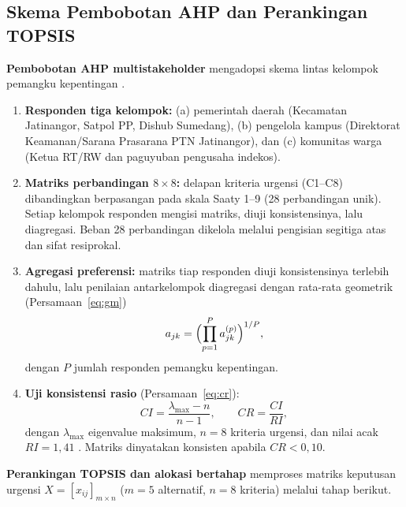 \documentclass[10pt,twocolumn,a4paper]{article}
\begin{document}
\subsection{Skema Pembobotan AHP dan Perankingan TOPSIS}
\textbf{Pembobotan AHP multistakeholder} mengadopsi skema lintas kelompok pemangku kepentingan \cite{ahmed}.
\begin{enumerate}[label=\arabic*)]
\item \textbf{Responden tiga kelompok:} (a) pemerintah daerah (Kecamatan Jatinangor, Satpol PP, Dishub Sumedang), (b) pengelola kampus (Direktorat Keamanan/Sarana Prasarana PTN Jatinangor), dan (c) komunitas warga (Ketua RT/RW dan paguyuban pengusaha indekos).
\item \textbf{Matriks perbandingan $8\times8$:} delapan kriteria urgensi (C1--C8) dibandingkan berpasangan pada skala Saaty 1--9 (28 perbandingan unik). Setiap kelompok responden mengisi matriks, diuji konsistensinya, lalu diagregasi. Beban 28 perbandingan dikelola melalui pengisian segitiga atas dan sifat resiprokal.
\item \textbf{Agregasi preferensi:} matriks tiap responden diuji konsistensinya terlebih dahulu, lalu penilaian antarkelompok diagregasi dengan rata-rata geometrik (Persamaan~\eqref{eq:gm})
\begin{equation}
a_{jk}=\Bigl(\prod_{p=1}^{P} a_{jk}^{(p)}\Bigr)^{1/P},\label{eq:gm}
\end{equation}
dengan $P$ jumlah responden pemangku kepentingan.
\item \textbf{Uji konsistensi rasio} (Persamaan~\eqref{eq:cr}):
\begin{equation}
\mathit{CI}=\frac{\lambda_{\max}-n}{n-1},\qquad \mathit{CR}=\frac{\mathit{CI}}{\mathit{RI}},\label{eq:cr}
\end{equation}
dengan $\lambda_{\max}$ eigenvalue maksimum, $n=8$ kriteria urgensi, dan nilai acak $\mathit{RI}=1{,}41$ \cite{saaty}. Matriks dinyatakan konsisten apabila $\mathit{CR}<0{,}10$.
\end{enumerate}
\textbf{Perankingan TOPSIS dan alokasi bertahap} memproses matriks keputusan urgensi $X=[x_{ij}]_{m\times n}$ ($m=5$ alternatif, $n=8$ kriteria) melalui tahap berikut.
\end{document}
